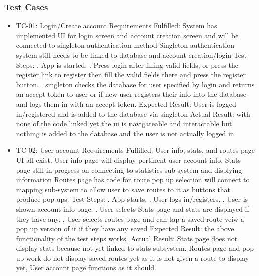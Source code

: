 \documentclass{article}
\begin{document}
\subsubsection{Test Cases}
\begin{itemize}
\item TC-01: Login/Create account
\subitem Requirements Fulfilled:
\subsubitem System has implemented UI for login screen and account creation screen and will be connected to singleton authentication method
\subsubitem Singleton authentication system still needs to be linked to database and account creation/login
\subitem Test Steps:
. App is started.
. Press login after filling valid fields, or press the register link to register then fill the valid fields there and press the register button.
. singleton checks the database for user specified by login and returns an accept token to user or if new user registers their info into the database and logs them in with an accept token.
\subitem Expected Result: User is logged in/registered and is added to the database via singleton
\subitem Actual Result: with none of the code linked yet the ui is navigateable and interactable but nothing is added to the database and the user is not actually logged in.
\item TC-02: User account
\subitem Requirements Fulfilled:
\subsubitem User info, stats, and routes page UI all exist.
\subsubitem User info page will display pertinent user account info.
\subsubitem Stats page still in progress on connecting to statistics sub-system and displying information
\subsubitem Routes page has code for route pop up selection will connect to mapping sub-system to allow user to save routes to it as buttons that produce pop ups.
\subitem Test Steps:
. App starts.
. User logs in/registers.
. User is shown account info page.
. User selects Stats page and stats are displayed if they have any.
. User selects routes page and can tap a saved route veiw a pop up version of it if they have any saved
\subitem Expected Result: the above functionality of the test steps works.
\subitem Actual Result: Stats page does not display stats because not yet linked to stats subsystem, Routes page and pop up work do not display saved routes yet as it is not given a route to display yet, User account page functions as it should.
\end{itemize}
\end{document}
